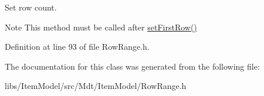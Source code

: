 Set row count. 

\begin{DoxyNote}{Note}
This method must be called after \hyperlink{class_mdt_1_1_item_model_1_1_row_range_a018c6882ab0e6fab38c6cb39e1ba1a17}{set\+First\+Row()} 
\end{DoxyNote}


Definition at line 93 of file Row\+Range.\+h.



The documentation for this class was generated from the following file\+:\begin{DoxyCompactItemize}
\item 
libs/\+Item\+Model/src/\+Mdt/\+Item\+Model/Row\+Range.\+h\end{DoxyCompactItemize}
